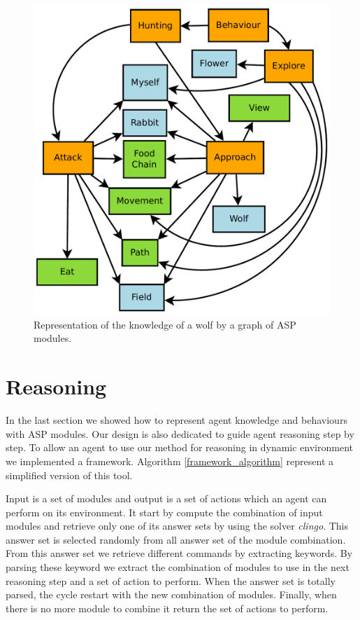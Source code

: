 \documentclass{aamas2012}
\begin{document}
	\begin{figure}
		\centering
		\includegraphics[keepaspectratio=true, scale=0.4]{knowledge_organisation.pdf}
		\caption
		{
			\label{organisation_figure}
			Representation of the knowledge of a wolf by a graph of ASP modules.
		}
	\end{figure}
	
\section{Reasoning}

	In the last section we showed how to represent agent knowledge and behaviours with ASP modules.
	Our design is also dedicated to guide agent reasoning step by step.
	To allow an agent to use our method for reasoning in dynamic environment we implemented a framework.
	Algorithm \ref{framework_algorithm} represent a simplified version of this tool.
	
	Input is a set of modules and output is a set of actions which an agent can perform on its environment.
	It start by compute the combination of input modules and retrieve only one of its answer sets by using the solver \textit{clingo}.
	This answer set is selected randomly from all answer set of the module combination.
	From this answer set we retrieve different commands by extracting keywords.
	By parsing these keyword we extract the combination of modules to use in the next reasoning step and a set of action to perform.
	When the answer set is totally parsed, the cycle restart with the new combination of modules.
	Finally, when there is no more module to combine it return the set of actions to perform.
\end{document}
